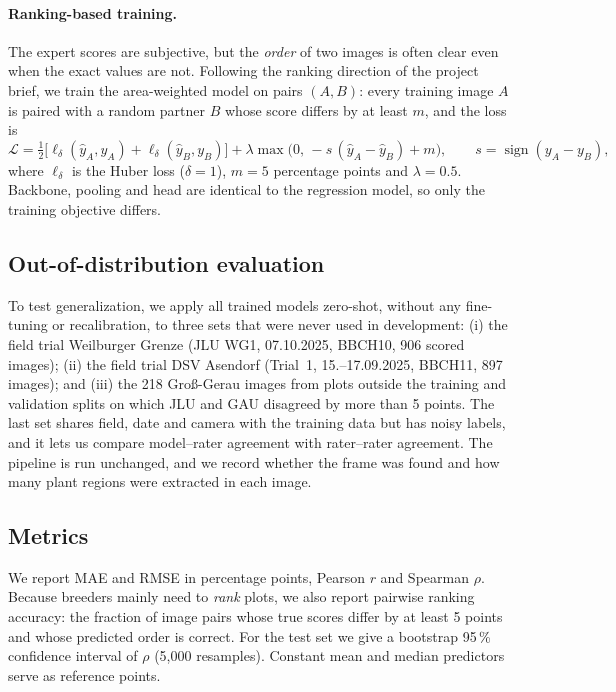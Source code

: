 \paragraph{Ranking-based training.} The expert scores are subjective, but the \emph{order} of two
images is often clear even when the exact values are not. Following the ranking direction of the
project brief, we train the area-weighted model on pairs $(A,B)$: every training image $A$ is paired
with a random partner $B$ whose score differs by at least $m$, and the loss is
\begin{equation}
  \mathcal{L} = \tfrac12\big[\ell_\delta(\hat y_A, y_A) + \ell_\delta(\hat y_B, y_B)\big]
  + \lambda \max\!\big(0,\, -s\,(\hat y_A - \hat y_B) + m\big),
  \qquad s = \operatorname{sign}(y_A - y_B),
\end{equation}
where $\ell_\delta$ is the Huber loss ($\delta = 1$), $m = 5$ percentage points and
$\lambda = 0.5$. Backbone, pooling and head are identical to the regression model, so only the
training objective differs.

\subsection{Out-of-distribution evaluation}
\label{sec:ood-method}

To test generalization, we apply all trained models zero-shot, without any fine-tuning or
recalibration, to three sets that were never used in development: (i) the field trial Weilburger Grenze
(JLU WG1, 07.10.2025, BBCH10, 906 scored images); (ii) the field trial DSV Asendorf (Trial~1,
15.--17.09.2025, BBCH11, 897 images); and (iii) the 218 Gro\ss-Gerau images from plots outside the
training and validation splits on which JLU and GAU disagreed by more than 5 points. The last set
shares field, date and camera with the training data but has noisy labels, and it lets us compare
model--rater agreement with rater--rater agreement. The pipeline is run unchanged, and we record
whether the frame was found and how many plant regions were extracted in each image.

\subsection{Metrics}
\label{sec:metrics}

We report MAE and RMSE in percentage points, Pearson $r$ and Spearman $\rho$. Because breeders
mainly need to \emph{rank} plots, we also report pairwise ranking accuracy: the fraction of image
pairs whose true scores differ by at least 5 points and whose predicted order is correct. For the
test set we give a bootstrap 95\,\% confidence interval of $\rho$ (5{,}000 resamples). Constant
mean and median predictors serve as reference points.
